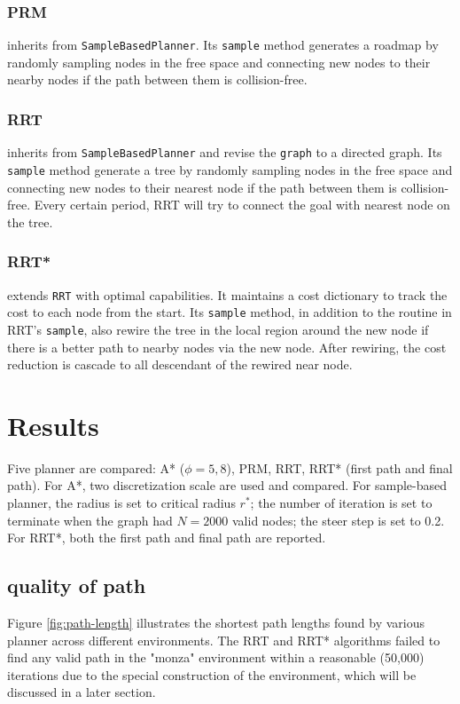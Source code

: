 \documentclass[conference]{IEEEtran}
\begin{document}
\subsubsection{PRM}
inherits from \texttt{SampleBasedPlanner}. 
Its \texttt{sample} method generates a roadmap by 
randomly sampling nodes in the free space and 
connecting new nodes to their nearby nodes if the path between them is collision-free. 

\subsubsection{RRT}
inherits from \texttt{SampleBasedPlanner} and revise the \texttt{graph} to a directed graph. 
Its \texttt{sample} method generate a tree by 
randomly sampling nodes in the free space and
connecting new nodes to their nearest node if the path between them is collision-free.
Every certain period, RRT will try to connect the goal with nearest node on the tree.

\subsubsection{RRT*}
extends \texttt{RRT} with optimal capabilities. 
It maintains a cost dictionary to track the cost to each node from the start. 
Its \texttt{sample} method, in addition to the routine in RRT's \texttt{sample},
also rewire the tree in the local region around the new node if there is a better path to nearby nodes via the new node.
After rewiring, the cost reduction is cascade to all descendant of the rewired near node.

\section{Results}

Five planner are compared: A* ($\phi = 5, 8$),
PRM, RRT, RRT* (first path and final path).
For A*, two discretization scale are used and compared.
For sample-based planner,
the radius is set to critical radius $r^*$;
the number of iteration is set to terminate 
when the graph had $N = 2000$ valid nodes;
the steer step is set to 0.2.
For RRT*, both the first path and final path are reported.

\subsection{quality of path}
Figure \ref{fig:path-length} illustrates the shortest path lengths found 
by various planner across different environments. 
The RRT and RRT* algorithms failed to find any valid path in the "monza" environment 
within a reasonable (50,000) iterations due to the special construction of the environment, 
which will be discussed in a later section.
\end{document}

